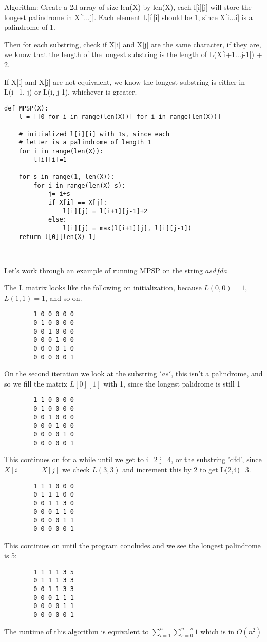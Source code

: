 \documentclass[12pt]{article}
\newenvironment{question}[2][Question]{\begin{trivlist}
		\item[\hskip \labelsep {\bfseries #1}\hskip \labelsep {\bfseries #2.}]}{\end{trivlist}}
\begin{document}
	\begin{question}{3b}
Algorithm: Create a 2d array of size len(X) by len(X), each l[i][j] will store the longest palindrome in X[i...j]. 
Each element L[i][i] should be 1, since X[i...i] is a palindrome of 1.

Then for each substring, check if X[i] and X[j] are the same character, if they are, we know that the length of the longest substring is the length of L(X[i+1...j-1]) + 2.

If X[i] and X[j] are not equivalent, we know the longest substring is either in L(i+1, j) or L(i, j-1), whichever is greater.

		
		\begin{lstlisting}
def MPSP(X):
	l = [[0 for i in range(len(X))] for i in range(len(X))]
	
	# initialized l[i][i] with 1s, since each 
	# letter is a palindrome of length 1
	for i in range(len(X)):
		l[i][i]=1
	
	for s in range(1, len(X)):
		for i in range(len(X)-s):         
			j= i+s
			if X[i] == X[j]:
				l[i][j] = l[i+1][j-1]+2
			else:
				l[i][j] = max(l[i+1][j], l[i][j-1])
	return l[0][len(X)-1]
					
					
		\end{lstlisting}
		
		
		Let's work through an example of running MPSP on the string $asdfda$
		
		The L matrix looks like the following on initialization, because $L(0,0)=1$, $L(1,1)=1$, and so on.
		\begin{lstlisting}
		1 0 0 0 0 0
		0 1 0 0 0 0
		0 0 1 0 0 0
		0 0 0 1 0 0
		0 0 0 0 1 0
		0 0 0 0 0 1
		\end{lstlisting}
		
		On the second iteration we look at the substring $'as'$, this isn't a palindrome, and so we fill the matrix $L[0][1]$ with 1, since the longest palidrome is still 1
		
		\begin{lstlisting}
		1 1 0 0 0 0
		0 1 0 0 0 0
		0 0 1 0 0 0
		0 0 0 1 0 0
		0 0 0 0 1 0
		0 0 0 0 0 1
		\end{lstlisting}
		
		This continues on for a while until we get to i=2 j=4, or the substring 'dfd', since $X[i]==X[j]$ we check $L(3,3)$ and increment this by 2 to get L(2,4)=3. 
		
		\begin{lstlisting}
		1 1 1 0 0 0
		0 1 1 1 0 0
		0 0 1 1 3 0
		0 0 0 1 1 0
		0 0 0 0 1 1
		0 0 0 0 0 1
		\end{lstlisting}
		
		This continues on until the program concludes and we see the longest palindrome is 5:
		\begin{lstlisting}
		1 1 1 1 3 5
		0 1 1 1 3 3
		0 0 1 1 3 3
		0 0 0 1 1 1
		0 0 0 0 1 1
		0 0 0 0 0 1
		\end{lstlisting}
		
		
				
		The runtime of this algorithm is equivalent to $\sum_{i=1}^{n}{\sum_{s=0}^{n-s}{1}}$ which is in $O(n^2)$


	\end{question}
\end{document}
